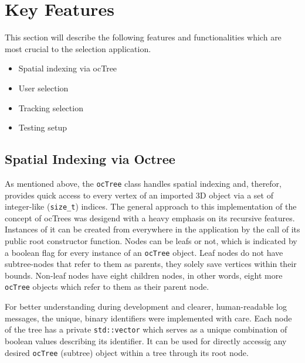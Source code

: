 \section{Key Features}
\label{sec:key_features}
This section will describe the following features and functionalities which are most crucial to the selection application.

\begin{itemize}  
	\item Spatial indexing via ocTree
	\item User selection
	\item Tracking selection
	\item Testing setup 
\end{itemize}

\subsection{Spatial Indexing via Octree}
\label{sec:spatial_indexing_via_octree}

As mentioned above, the \texttt{ocTree} class handles spatial indexing and, therefor, provides quick access to every vertex of an imported 3D object via a set of integer-like (\texttt{size\_t}) indices. The general approach to this implementation of the concept of ocTrees was desigend with a heavy emphasis on its recursive features. Instances of it can be created from everywhere in the application by the call of its public root constructor function. Nodes can be leafs or not, which is indicated by a boolean flag for every instance of an \texttt{ocTree} object. Leaf nodes do not have subtree-nodes that refer to them as parents, they solely save vertices within their bounds. Non-leaf nodes have eight children nodes, in other words, eight more \texttt{ocTree} objects which refer to them as their parent node.

For better understanding during development and clearer, human-readable log messages, the unique, binary identifiers were implemented with care. Each node of the tree has a private \texttt{std::vector} which serves as a unique combination of boolean values describing its identifier. It can be used for directly accessig any desired \texttt{ocTree} (subtree) object within a tree through its root node.

